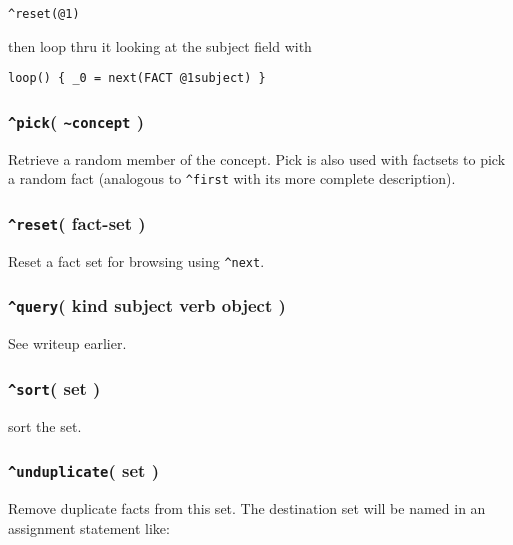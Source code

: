 \documentclass[]{article}
\begin{document}
\begin{verbatim}
^reset(@1)
\end{verbatim}

then loop thru it looking at the subject field with

\begin{verbatim}
loop() { _0 = next(FACT @1subject) }
\end{verbatim}

\subsubsection{\texorpdfstring{\texttt{\^{}pick}(
\texttt{\textasciitilde{}concept}
)}{\^{}pick( \textasciitilde{}concept )}}\label{pick-concept}

Retrieve a random member of the concept. Pick is also used with factsets
to pick a random fact (analogous to \texttt{\^{}first} with its more
complete description).

\subsubsection{\texorpdfstring{\texttt{\^{}reset}( fact-set
)}{\^{}reset( fact-set )}}\label{reset-fact-set}

Reset a fact set for browsing using \texttt{\^{}next}.

\subsubsection{\texorpdfstring{\texttt{\^{}query}( kind subject verb
object
)}{\^{}query( kind subject verb object )}}\label{query-kind-subject-verb-object-1}

See writeup earlier.

\subsubsection{\texorpdfstring{\texttt{\^{}sort}( set
)}{\^{}sort( set )}}\label{sort-set}

sort the set.

\subsubsection{\texorpdfstring{\texttt{\^{}unduplicate}( set
)}{\^{}unduplicate( set )}}\label{unduplicate-set}

Remove duplicate facts from this set. The destination set will be named
in an assignment statement like:
\end{document}
